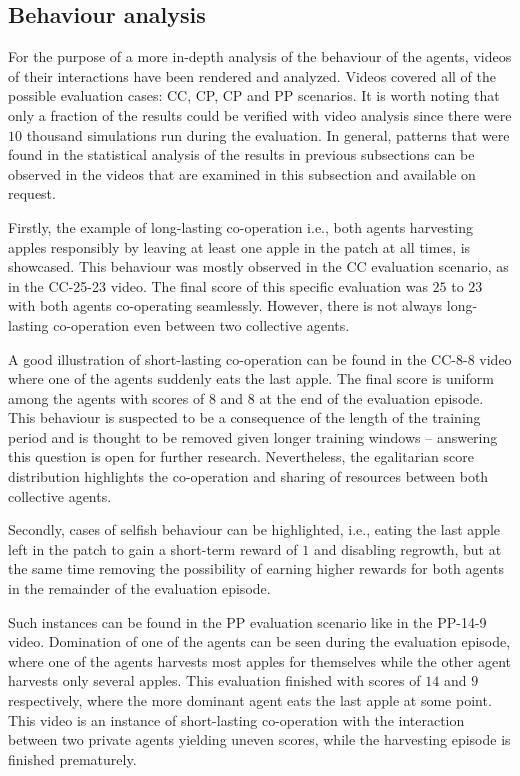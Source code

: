 \documentclass[pdflatex,sn-basic,lineno]{sn-jnl}
\theoremstyle{thmstyleone}%
\theoremstyle{thmstyletwo}%
\theoremstyle{thmstylethree}%
\begin{document}
\subsection{Behaviour analysis}\label{subsec4-4}

For the purpose of a more in-depth analysis of the behaviour of the agents, videos of their interactions have been
rendered and analyzed. Videos covered all of the possible evaluation cases: CC, CP, CP and PP scenarios. It is worth
noting that only a fraction of the results could be verified with video analysis since there were $10$ thousand
simulations run during the evaluation. In general, patterns that were found in the statistical analysis of the results
in previous subsections can be
observed in the videos that are examined in this subsection and available on request.

Firstly, the example of long-lasting co-operation i.e., both agents harvesting apples responsibly by leaving at least
one apple in the patch at all times, is showcased. This behaviour was mostly observed in the CC evaluation scenario, as
in the CC-25-23 video. The final score of this specific evaluation was $25$ to $23$ with both agents co-operating
seamlessly. However, there is not always long-lasting co-operation even between two collective agents.  


A good illustration of short-lasting co-operation can be found in the CC-8-8 video where one of the agents suddenly eats
the last apple. The final score is uniform among the agents with scores of $8$ and $8$ at the end of the evaluation
episode. This behaviour is suspected to be a consequence of the length of the training period and is thought to be
removed given longer training windows -- answering this question is open for further research. Nevertheless, the
egalitarian score distribution highlights the co-operation and sharing of resources between both
collective agents.

Secondly, cases of selfish behaviour can be highlighted, i.e., eating the last apple left in the patch to gain a
short-term reward of $1$ and disabling regrowth, but at the same time removing the possibility of earning higher rewards
for both agents in the remainder of the
evaluation episode.

Such instances can be found in the PP evaluation scenario like in the PP-14-9 video. Domination of one of the agents can
be seen during the evaluation episode, where one of the agents harvests most apples for themselves while the other agent
harvests only several apples. This evaluation finished with scores of $14$ and $9$ respectively, where the more dominant
agent eats the last apple at some point.
This video is an instance of short-lasting co-operation with the interaction between two private agents yielding uneven
scores, while the harvesting episode is finished prematurely.
\end{document}
